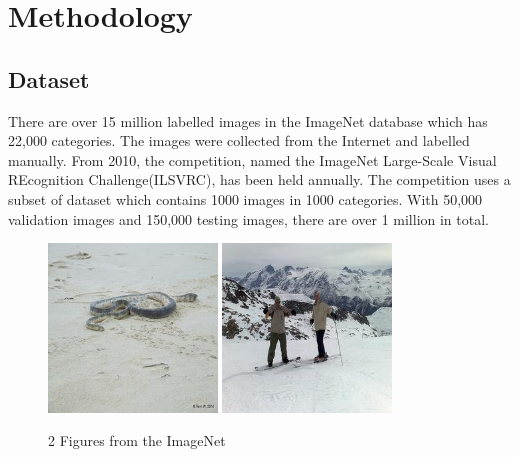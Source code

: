 
\chapter{Methodology} %
\label{Chapter3}

\section{Dataset}

There are over 15 million labelled images in the ImageNet database which has 22,000 categories. The images were collected from the Internet and labelled manually. From 2010, the competition, named the ImageNet Large-Scale Visual REcognition Challenge(ILSVRC), has been held annually. The competition uses a subset of dataset which contains 1000 images in 1000 categories. With 50,000 validation images and 150,000 testing images, there are over 1 million in total.
\graphicspath{ {./Figures/} }
\begin{figure}[!htb]
    \centering
	\includegraphics[width=0.4\textwidth]{ILSVRC2012_val_00000001.JPEG}
    \qquad
    \includegraphics[width=0.4\textwidth]{ILSVRC2012_val_00000002.JPEG}
    \caption{2 Figures from the ImageNet}%
    \label{fig:ImageNetExamples}%
\end{figure}

